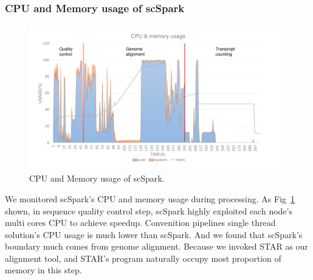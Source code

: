 \documentclass[runningheads]{llncs}
\begin{document}
\subsubsection{CPU and Memory usage of scSpark}
\begin{figure}
  \includegraphics[width=\textwidth]{fig8.pdf}
  \caption{CPU and Memory usage of scSpark.} \label{fig8}
\end{figure}
We monitored scSpark's CPU and memory usage during processing.
As Fig~\ref{fig8} shown, in sequence quality control step, scSpark highly exploited each node's multi cores CPU to achieve speedup.
Convenition pipelines single thread solution's CPU usage is much lower than scSpark.
And we found that scSpark's boundary much comes from genome alignment.
Because we invoked STAR as our alignment tool, and STAR's program naturally occupy most proportion of memory in this step.
\end{document}
